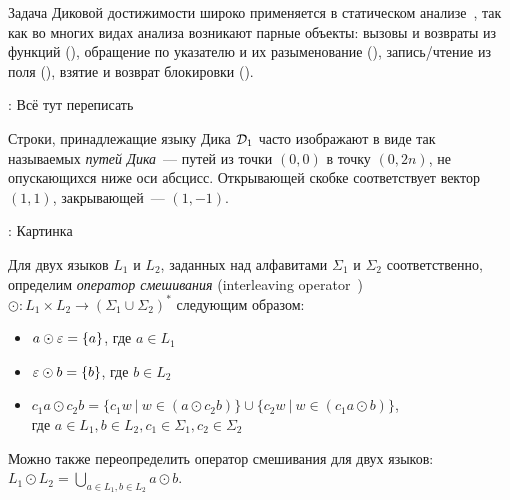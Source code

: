 Задача Диковой достижимости широко применяется в статическом анализе~\cite{}, так как во многих видах анализа возникают парные объекты: вызовы и возвраты из функций (\TODO), обращение по указателю и их разыменование (\TODO), запись/чтение из поля (\TODO), взятие и возврат блокировки (\TODO).



\TODO: Всё тут переписать

\begin{note}
  Строки, принадлежащие языку Дика $\mathcal{D}_1$ часто изображают в виде так называемых \textit{путей Дика}~--- путей из точки $(0, 0)$ в точку $(0, 2n)$, не опускающихся ниже оси абсцисс. Открывающей скобке соответствует вектор $(1, 1)$, закрывающей~--- $(1, -1)$.

  \TODO: Картинка 
\end{note}

\begin{definition}
  Для двух языков $L_1$ и $L_2$, заданных над алфавитами $\Sigma_1$ и $\Sigma_2$ соответственно, определим \textit{оператор смешивания} (interleaving operator~\cite{Li21})\\ $\odot: L_1 \times L_2 \to (\Sigma_1 \cup \Sigma_2)^{*}$ следующим образом:
  \vspace{-\topsep}
  \begin{itemize}
    \setlength\itemsep{-0.1em}
    \item $a \odot \varepsilon = \{ a \}$, где $a \in L_1$
    \item $\varepsilon \odot b = \{ b \}$, где $b \in L_2$
    \item $c_1 a \odot c_2 b = \{ c_1 w~|~w \in (a \odot c_2 b) \} \cup \{ c_2 w~|~w \in (c_1 a \odot b) \}$,\\ где $a \in L_1, b \in L_2, c_1 \in \Sigma_1, c_2 \in \Sigma_2$
  \end{itemize}

  Можно также переопределить оператор смешивания для двух языков:\\ $L_1 \odot L_2 = \bigcup\limits_{a \in L_1, b \in L_2} a \odot b$.
\end{definition}

